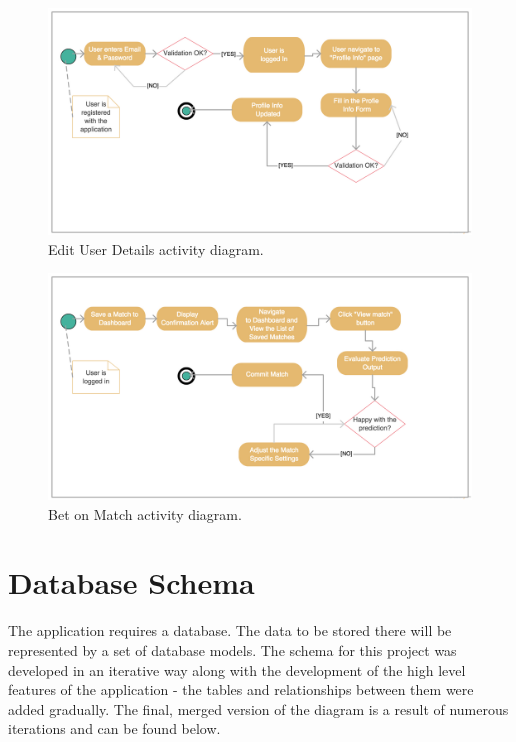 \begin{figure}[H]
	\begin{center}
		\includegraphics[width=.90\textwidth]{design/images/ad_2.jpg}
		\caption{Edit User Details activity diagram.} \label{fig:using:activitydiagram2}
	\end{center}
\end{figure}

\begin{figure}[H]
	\begin{center}
		\includegraphics[width=.90\textwidth]{design/images/ad_3.jpg}
		\caption{Bet on Match activity diagram.} \label{fig:using:activitydiagram3}
	\end{center}
\end{figure}

\section{Database Schema}
\label{databaseschema_design}
The application requires a database. The data to be stored there will be represented by a set of database models. The schema for this project was developed in an iterative way along with the development of the high level features of the application - the tables and relationships between them were added gradually. The final, merged version of the diagram is a result of numerous iterations and can be found below.


